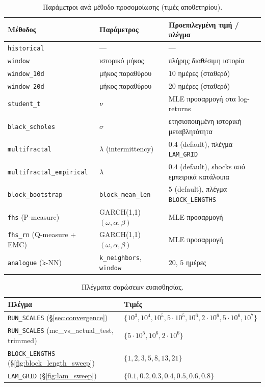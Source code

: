 \documentclass[12pt]{article}
\begin{document}
\begin{table}[H]
\centering
\small
\caption{Παράμετροι ανά μέθοδο προσομοίωσης (τιμές αποθετηρίου).}
\label{tab:appA_methods}
\begin{tabular}{p{4.2cm} p{3.5cm} p{5.8cm}}
\hline
Μέθοδος & Παράμετρος & Προεπιλεγμένη τιμή / πλέγμα \\ \hline
\texttt{historical} & --- & --- \\
\texttt{window} & ιστορικό μήκος & πλήρης διαθέσιμη ιστορία \\
\texttt{window\_10d} & μήκος παραθύρου & $10$ ημέρες (σταθερό) \\
\texttt{window\_20d} & μήκος παραθύρου & $20$ ημέρες (σταθερό) \\
\texttt{student\_t} & $\nu$ & MLE προσαρμογή στα log-returns \\
\texttt{black\_scholes} & $\sigma$ & ετησιοποιημένη ιστορική μεταβλητότητα \\
\texttt{multifractal} & $\lambda$ (intermittency) & $0.4$ (default), πλέγμα \texttt{LAM\_GRID} \\
\texttt{multifractal\_\allowbreak empirical} & $\lambda$ & $0.4$ (default), shocks από εμπειρικά κατάλοιπα \\
\texttt{block\_\allowbreak bootstrap} & \texttt{block\_\allowbreak mean\_len} & $5$ (default), πλέγμα \texttt{BLOCK\_LENGTHS} \\
\texttt{fhs} (P-measure) & GARCH(1,1) $(\omega,\alpha,\beta)$ & MLE προσαρμογή \\
\texttt{fhs\_rn} (Q-measure + EMC) & GARCH(1,1) $(\omega,\alpha,\beta)$ & MLE προσαρμογή \\
\texttt{analogue} (k-NN) & \texttt{k\_neighbors}, \texttt{window} & $20$, $5$ ημέρες \\ \hline
\end{tabular}
\end{table}

\begin{table}[h]
\centering
\small
\caption{Πλέγματα σαρώσεων ευαισθησίας.}
\label{tab:appA_sweeps}
\begin{tabular}{p{4.0cm} p{8.5cm}}
\hline
Πλέγμα & Τιμές \\ \hline
\texttt{RUN\_SCALES} (\S\ref{sec:convergence}) & $\{10^{3}, 10^{4}, 10^{5}, 5\cdot 10^{5}, 10^{6}, 2\cdot 10^{6}, 5\cdot 10^{6}, 10^{7}\}$ \\
\texttt{RUN\_SCALES} (mc\_vs\_actual\_test, trimmed) & $\{5\cdot 10^{5}, 10^{6}, 2\cdot 10^{6}\}$ \\
\texttt{BLOCK\_LENGTHS} (\S\ref{fig:block_length_sweep}) & $\{1, 2, 3, 5, 8, 13, 21\}$ \\
\texttt{LAM\_GRID} (\S\ref{fig:lam_sweep}) & $\{0.1, 0.2, 0.3, 0.4, 0.5, 0.6, 0.8\}$ \\ \hline
\end{tabular}
\end{table}
\end{document}
